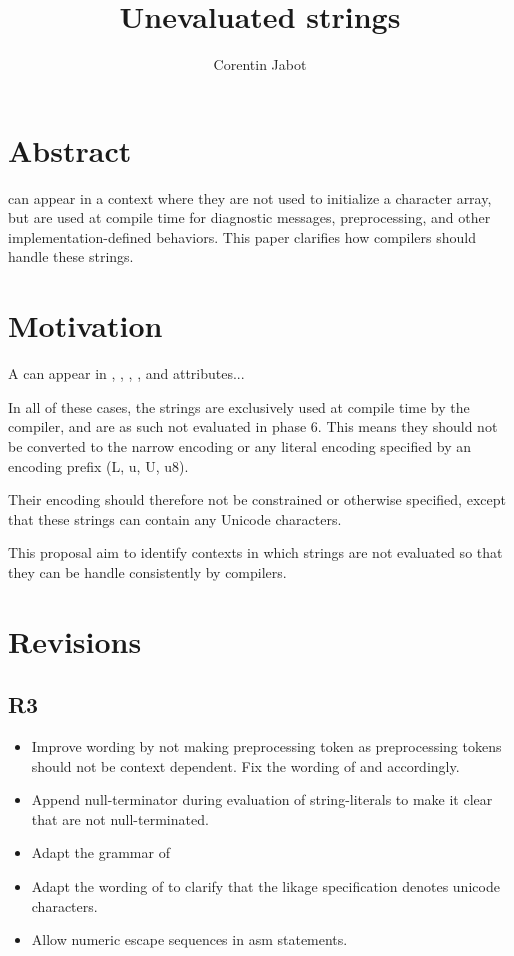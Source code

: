 \documentclass{wg21}
\title{Unevaluated strings}
\author{Corentin Jabot}{corentin.jabot@gmail.com}
\begin{document}
\maketitle

\section{Abstract}

 can appear in a context where they are not used to
initialize a character array, but are used at compile time for diagnostic messages,
preprocessing, and other implementation-defined behaviors.
This paper clarifies how compilers should handle these strings.


\section{Motivation}

A  can appear in , , ,
, \tcode{[[deprecated]]} and \tcode{[[nodiscard]]} attributes...

In all of these cases, the strings are exclusively used at compile time by the compiler, and are as such not evaluated in phase 6.
This means they should not be converted to the narrow encoding or any literal encoding specified by an encoding prefix (L, u, U, u8).

Their encoding should therefore not be constrained or otherwise specified,
except that these strings can contain any Unicode characters.

This proposal aim to identify contexts in which strings are not evaluated so that they can be handle consistently by compilers.

\section{Revisions}

\subsection{R3}
\begin{itemize}
    \item Improve wording by not making  preprocessing token as preprocessing tokens should not be context dependent. Fix the wording of  and  accordingly.
    \item Append null-terminator during evaluation of string-literals to make it clear that  are not null-terminated.
    \item Adapt the grammar of 
    \item Adapt the wording of  to clarify that the likage specification denotes unicode characters.
    \item Allow numeric escape sequences in asm statements.
\end{itemize}
\end{document}
